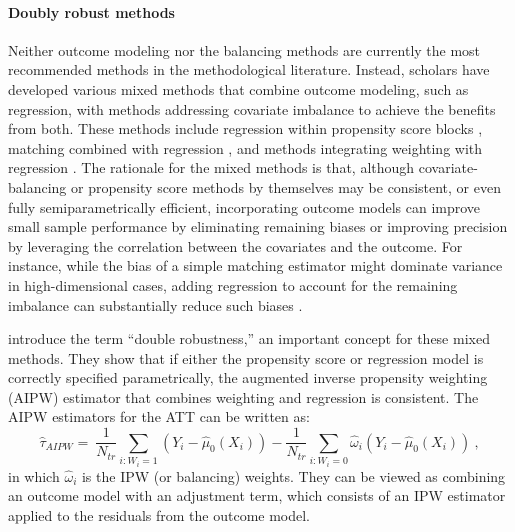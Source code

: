 \documentclass[letterpaper,12pt,leqno]{article}
\newcommand{\guido}[1]{
    \todo[inline,color=orange!50]{
    \textbf{Guido:}   #1    }}
\begin{document}
\paragraph{Doubly robust methods} 
Neither outcome modeling nor the balancing methods are currently the most recommended methods in the methodological literature. Instead, scholars have developed various mixed methods that combine outcome modeling, such as regression, with methods addressing covariate imbalance to achieve the benefits from both. These methods include regression within propensity score blocks \citep{rosenbaum1983assessing, imbens2015}, matching combined with regression \citep{abadie2011bias}, and methods integrating weighting with regression \citep[e.g.,][]{robins1994estimation, robins1995semiparametric}. The rationale for the mixed methods is that, although covariate-balancing or propensity score methods by themselves may be consistent, or even fully semiparametrically efficient, incorporating outcome models can improve small sample performance by eliminating remaining biases or improving precision by leveraging the correlation between the covariates and the outcome. For instance, while the bias of a simple matching estimator might dominate variance in high-dimensional cases, adding regression to account for the remaining imbalance can substantially reduce such biases \citep{abadie2011bias}.


\citet{robins1997toward} introduce the term ``double robustness,'' an important concept for these mixed methods. They show that if either the propensity score or regression model is correctly specified parametrically, the augmented inverse propensity weighting (AIPW) estimator that combines weighting and regression is consistent. The AIPW estimators for the ATT can be written as:
\[
\hat{\tau}_{AIPW}  =\  \frac{1}{N_{tr}} \sum_{i: W_{i} = 1} \left( Y_i- \hat{\mu}_0(X_{i})\right) - \frac{1}{N_{tr}}\sum_{i: W_{i} = 0} \hat{\omega}_{i}\left(Y_i- \hat{\mu}_0(X_{i})\right)\ ,\] 
in which $\hat{\omega}_{i}$ is the IPW (or balancing) weights. They can be viewed as combining an outcome model with an adjustment term, which consists of an IPW estimator applied to the residuals from the outcome model.
\end{document}
